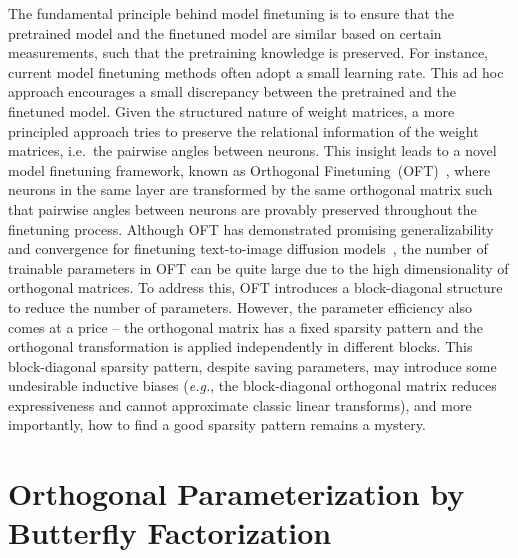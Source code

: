 The fundamental principle behind model finetuning is to ensure that the pretrained model and the finetuned model are similar based on certain measurements, such that the pretraining knowledge is preserved. For instance, current model finetuning methods often adopt a small learning rate. This ad hoc approach encourages a small discrepancy between the pretrained and the finetuned model. Given the structured nature of weight matrices, a more principled approach  tries to preserve the relational information of the weight matrices, i.e.~the pairwise angles between neurons. This insight leads to a novel model finetuning framework, known as Orthogonal Finetuning~(OFT)~\cite{qiu2023controlling}, where neurons in the same layer are transformed by the same orthogonal matrix such that pairwise angles between neurons are provably preserved throughout the finetuning process. Although OFT has demonstrated promising generalizability and convergence for finetuning text-to-image diffusion models~\cite{qiu2023controlling}, the number of trainable parameters in OFT can be quite large due to the high dimensionality of orthogonal matrices. To address this, OFT introduces a block-diagonal structure to reduce the number of parameters. However, the parameter efficiency also comes at a price -- the orthogonal matrix has a fixed sparsity pattern and the orthogonal transformation is applied independently in different blocks. This block-diagonal sparsity pattern, despite saving parameters, may introduce some undesirable inductive biases (\emph{e.g.}, the block-diagonal orthogonal matrix reduces expressiveness and cannot approximate classic linear transforms), and more importantly, how to find a good sparsity pattern remains a mystery.

\section{Orthogonal Parameterization by Butterfly Factorization}

